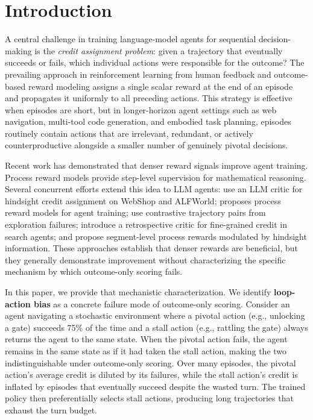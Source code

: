 \documentclass[11pt]{article}
\begin{document}
\section{Introduction}
\label{sec:intro}

A central challenge in training language-model agents for sequential decision-making is the \emph{credit assignment problem}: given a trajectory that eventually succeeds or fails, which individual actions were responsible for the outcome? The prevailing approach in reinforcement learning from human feedback \citep[RLHF;][]{ouyang2022training} and outcome-based reward modeling \citep{cobbe2021training} assigns a single scalar reward at the end of an episode and propagates it uniformly to all preceding actions. This strategy is effective when episodes are short, but in longer-horizon agent settings such as web navigation, multi-tool code generation, and embodied task planning, episodes routinely contain actions that are irrelevant, redundant, or actively counterproductive alongside a smaller number of genuinely pivotal decisions.

Recent work has demonstrated that denser reward signals improve agent training. Process reward models \citep{lightman2023lets,uesato2022solving,setlur2024rewarding} provide step-level supervision for mathematical reasoning. Several concurrent efforts extend this idea to LLM agents: \citet{tan2026hindsight} use an LLM critic for hindsight credit assignment on WebShop and ALFWorld; \citet{choudhury2025process} proposes process reward models for agent training; \citet{song2024trial} use contrastive trajectory pairs from exploration failures; \citet{zhang2025criticsearch} introduce a retrospective critic for fine-grained credit in search agents; and \citet{lu2026hisr} propose segment-level process rewards modulated by hindsight information. These approaches establish that denser rewards are beneficial, but they generally demonstrate improvement without characterizing the specific mechanism by which outcome-only scoring fails.

In this paper, we provide that mechanistic characterization. We identify \textbf{loop-action bias} as a concrete failure mode of outcome-only scoring. Consider an agent navigating a stochastic environment where a pivotal action (e.g., unlocking a gate) succeeds 75\% of the time and a stall action (e.g., rattling the gate) always returns the agent to the same state. When the pivotal action fails, the agent remains in the same state as if it had taken the stall action, making the two indistinguishable under outcome-only scoring. Over many episodes, the pivotal action's average credit is diluted by its failures, while the stall action's credit is inflated by episodes that eventually succeed despite the wasted turn. The trained policy then preferentially selects stall actions, producing long trajectories that exhaust the turn budget.
\end{document}

